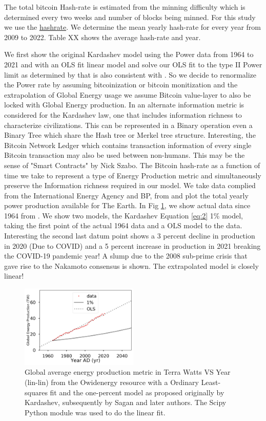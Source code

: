 \documentclass[final,5p,times,twocolumn,authoryear]{elsarticle}
\begin{document}
The total bitcoin Hash-rate is estimated from the minning difficulty which is determined every two weeks and number of blocks being minned. For this study we use the \href{https://data.nasdaq.com/data/BCHAIN/HRATE-bitcoin-hash-rate}{hashrate}. We determine the mean yearly hash-rate for every year from 2009 to 2022. Table XX shows the average hash-rate and year. 

We first show the original Kardashev model using the Power data from 1964 to 2021 and with an OLS fit linear model and solve our OLS fit to the type II Power limit as determined by \cite{kar64} that is also consistent with \cite{sagan73}. So we decide to renormalize the Power rate by assuming bitcoinization or bitcoin monitization and the extrapolation of Global Energy usage we assume Bitcoin value-layer to also be locked with Global Energy production. In \cite{sagan73} an alternate information metric is considered for the Kardashev law, one that includes information richness to characterize civilizations. This can be represented in a Binary operation even a Binary Tree which share the Hash tree or Merkel tree structure. Interesting, the Bitcoin Network Ledger which contains transaction information of every single Bitcoin transaction may also be used between non-humans. This may be the sense of "Smart Contracts" by Nick Szabo. The Bitcoin hash-rate as a function of time we take to represent a type of Energy Production metric and simultaneously preserve the Information richness required in our model. We take data complied from the International Energy Agency and BP, from \cite{owidenergy} and plot the total yearly power production available for The Earth. In Fig \ref{fig:kardashev1}, we show actual data since 1964 from \cite{owidenergy}. We show two models, the Kardashev Equation \ref{eq:2} 1\% model, taking the first point of the actual 1964 data and a OLS model to the data. Interesting the second last datum point shows a 3 percent decline in production in 2020 (Due to COVID) and a 5 percent increase in production in 2021 breaking the COVID-19 pandemic year! A slump due to the 2008 sub-prime crisis that gave rise to the Nakamoto consensus is shown. The extrapolated model is closely linear!
\begin{figure}
    \centering
    \includegraphics[width=0.5\textwidth]{figs/fig1_kard.jpg}
    \caption{Global average energy production metric in Terra Watts VS Year (lin-lin) from the Owidenergy resource with a Ordinary Least-squares fit and the one-percent model as proposed originally by Kardashev, subsequently by Sagan and later authors. The Scipy Python module was used to do the linear fit.}
    \label{fig:kardashev1}

\end{figure}
\end{document}
